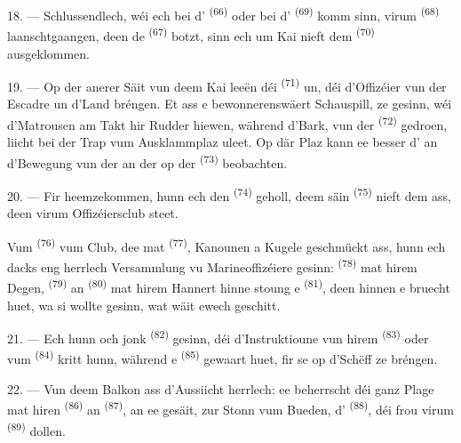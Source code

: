 18. --- Schlussendlech, wéi ech bei d' \textsuperscript{(66)} oder
bei d' \textsuperscript{(69)} komm sinn, virum 
\textsuperscript{(68)} laanschtgaangen, deen de  \textsuperscript{(67)}
botzt, sinn ech um Kai nieft dem  \textsuperscript{(70)}
ausgeklommen.

19. --- Op der anerer Säit vun deem Kai leeën déi 
\textsuperscript{(71)} un, déi d'Offizéier vun der Escadre un d'Land bréngen. Et ass
e bewonnerenswäert Schauspill, ze gesinn, wéi d'Matrousen am Takt hir Rudder hiewen,
während d'Bark, vun der  \textsuperscript{(72)} gedroen, liicht bei der
Trap vum Ausklammplaz uleet. Op där Plaz kann ee besser d' an
d'Bewegung vun der  an der  op der 
\textsuperscript{(73)} beobachten.

\VUsaut{3.0mm}
\VUsaut{3.0mm}

20. --- Fir heemzekommen, hunn ech den 
\textsuperscript{(74)} geholl, deem säin  \textsuperscript{(75)} nieft
dem  ass, deen virum Offizéiersclub steet.

Vum  \textsuperscript{(76)} vum Club, dee mat 
\textsuperscript{(77)}, Kanounen a Kugele geschmückt ass, hunn ech dacks eng
herrlech Versammlung vu Marineoffizéiere gesinn: 
\textsuperscript{(78)} mat hirem Degen, 
\textsuperscript{(79)} an  \textsuperscript{(80)} mat
hirem  Hannert hinne stoung e  \textsuperscript{(81)},
deen hinnen e  bruecht huet, wa si wollte gesinn, wat wäit ewech
geschitt.

21. --- Ech hunn och jonk  \textsuperscript{(82)} gesinn, déi
d'Instruktioune vun hirem  \textsuperscript{(83)} oder vum
 \textsuperscript{(84)} kritt hunn, während e
 \textsuperscript{(85)} gewaart huet, fir se op d'Schëff ze
bréngen.

22. --- Vun deem Balkon ass d'Aussiicht herrlech: ee beherrscht déi ganz Plage mat
hiren  \textsuperscript{(86)} an 
\textsuperscript{(87)}, an ee gesäit, zur Stonn vum Bueden, d'
\textsuperscript{(88)}, déi frou virum  \textsuperscript{(89)}
dollen.

